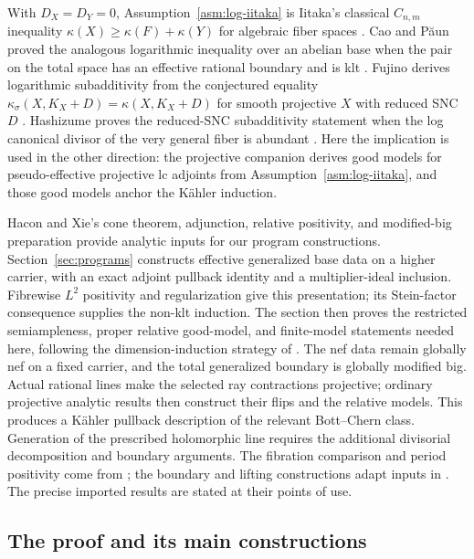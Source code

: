 With \(D_X=D_Y=0\), Assumption~\ref{asm:log-iitaka} is Iitaka's classical
\(C_{n,m}\) inequality
\(\kappa(X)\geq\kappa(F)+\kappa(Y)\) for algebraic fiber spaces
\cite[Equation~(1.0.1)]{CaoPaun2017}. Cao and Păun proved the analogous
logarithmic inequality over an abelian base when the pair on the total space
has an effective rational boundary and is klt
\cite[Theorem~1.1]{CaoPaun2017}. Fujino derives
logarithmic subadditivity from the conjectured equality
\(\kappa_\sigma(X,K_X+D)=\kappa(X,K_X+D)\) for smooth projective
\(X\) with reduced SNC \(D\)
\cite{Fujino2017Subadditivity,Fujino2020Corrigendum}. Hashizume proves the
reduced-SNC subadditivity statement when the log canonical divisor of the
very general fiber is abundant \cite[Theorem~1.2]{Hashizume2020}. Here the
implication is used in the other direction: the projective companion
\cite{LI} derives good models for pseudo-effective projective lc adjoints
from Assumption~\ref{asm:log-iitaka}, and those good models anchor the
Kähler induction.

Hacon and Xie's cone theorem, adjunction, relative positivity, and
modified-big preparation \cite{HX} provide analytic inputs for our
program constructions. Section~\ref{sec:programs} constructs effective
generalized base data on a higher carrier, with an exact adjoint
pullback identity and a multiplier-ideal inclusion. Fibrewise
$L^2$ positivity and regularization give this presentation; its
Stein-factor consequence supplies the non-klt induction.
The section then proves the restricted semiampleness, proper relative
good-model, and finite-model statements needed here, following the
dimension-induction strategy of \cite{HX}.
The nef data remain globally nef on a fixed carrier, and the total
generalized boundary is globally modified big. Actual rational lines
make the selected ray contractions projective; ordinary projective
analytic results \cite{FujinoAnalyticBCHM} then construct their flips
and the relative models. This produces a Kähler pullback description of
the relevant Bott--Chern class. Generation of the prescribed holomorphic
line requires the additional divisorial decomposition and boundary
arguments. The fibration comparison and period positivity come from
\cite{CI}; the boundary and lifting constructions adapt inputs in
\cite{CB,BL}. The precise imported results are stated at their points
of use.

\subsection{The proof and its main constructions}

